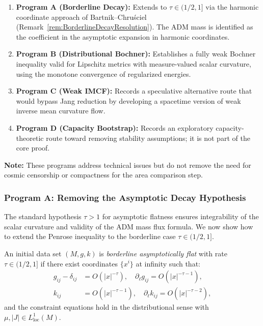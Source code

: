 \begin{remark}
\begin{enumerate}
    \item \textbf{Program A (Borderline Decay):} Extends to $\tau \in (1/2, 1]$ via the harmonic coordinate approach of Bartnik--Chru\'sciel (Remark~\ref{rem:BorderlineDecayResolution}). The ADM mass is identified as the coefficient in the asymptotic expansion in harmonic coordinates.
    \item \textbf{Program B (Distributional Bochner):} Establishes a fully weak Bochner inequality valid for Lipschitz metrics with measure-valued scalar curvature, using the monotone convergence of regularized energies.
    \item \textbf{Program C (Weak IMCF):} Records a speculative alternative route that would bypass Jang reduction by developing a spacetime version of weak inverse mean curvature flow.
    \item \textbf{Program D (Capacity Bootstrap):} Records an exploratory capacity-theoretic route toward removing stability assumptions; it is not part of the core proof.
\end{enumerate}
\textbf{Note:} These programs address technical issues but do not remove the need for cosmic censorship or compactness for the area comparison step.
\end{remark}

\subsubsection{Program A: Removing the Asymptotic Decay Hypothesis}
\label{sec:ProgramA}

The standard hypothesis $\tau > 1$ for asymptotic flatness ensures integrability of the scalar curvature and validity of the ADM mass flux formula. We now show how to extend the Penrose inequality to the borderline case $\tau \in (1/2, 1]$.

\begin{definition}\label{def:BorderlineAF}
An initial data set $(M, g, k)$ is \emph{borderline asymptotically flat} with rate $\tau \in (1/2, 1]$ if there exist coordinates $\{x^i\}$ at infinity such that:
\begin{align}
    g_{ij} - \delta_{ij} &= O(|x|^{-\tau}), \quad \partial_\ell g_{ij} = O(|x|^{-\tau-1}), \\
    k_{ij} &= O(|x|^{-\tau-1}), \quad \partial_\ell k_{ij} = O(|x|^{-\tau-2}),
\end{align}
and the constraint equations hold in the distributional sense with $\mu, |J| \in L^1_{\mathrm{loc}}(M)$.
\end{definition}

